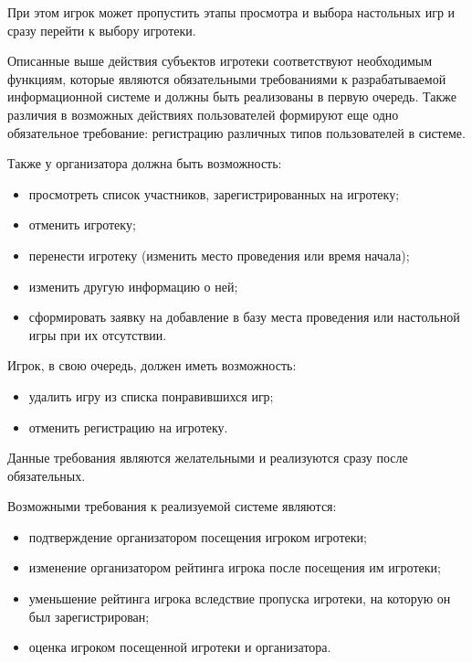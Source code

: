 При этом игрок может пропустить этапы просмотра и выбора настольных игр и
сразу перейти к выбору игротеки.

Описанные выше действия субъектов игротеки соответствуют необходимым функциям,
которые являются обязательными требованиями к разрабатываемой информационной
системе и должны быть реализованы в первую очередь. Также различия в возможных
действиях пользователей формируют еще одно обязательное требование: регистрацию
различных типов пользователей в системе.

Также у организатора должна быть возможность:
\begin{itemize}
    \item просмотреть список участников, зарегистрированных на игротеку;
    \item отменить игротеку;
    \item перенести игротеку (изменить место проведения или время начала);
    \item изменить другую информацию о ней;
    \item сформировать заявку на добавление в базу места проведения или
        настольной игры при их отсутствии.
\end{itemize}

\clearpage
Игрок, в свою очередь, должен иметь возможность:
\begin{itemize}
    \item удалить игру из списка понравившихся игр;
    \item отменить регистрацию на игротеку.
\end{itemize}

Данные требования являются желательными и реализуются сразу после обязательных.
 
Возможными требования к реализуемой системе являются:
\begin{itemize}
    \item подтверждение организатором посещения игроком игротеки;
    \item изменение организатором рейтинга игрока после посещения им игротеки;
    \item уменьшение рейтинга игрока вследствие пропуска игротеки, на которую он
        был зарегистрирован;
    \item оценка игроком посещенной игротеки и организатора.
\end{itemize}

